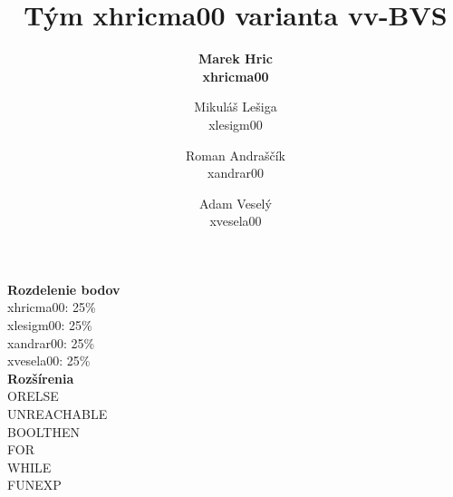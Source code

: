 \documentclass[12pt]{article}
\begin{document}
 
 
\title{\Huge \textbf{Tým xhricma00 varianta vv-BVS}}

\author{\bf Marek Hric \\
\bf xhricma00
\and Mikuláš Lešiga\\
 xlesigm00
\and Roman Andraščík \\
 xandrar00
\and Adam Veselý \\ 
xvesela00
}

\maketitle
\bigskip
\begin{center}
 \Large \textbf{Rozdelenie bodov}  \normalsize
 \\ 
\medskip
xhricma00: 25\% \\
xlesigm00: 25\% \\
xandrar00: 25\% \\
xvesela00: 25\%  \\
\bigskip
 \Large \textbf{Rozšírenia} \normalsize
\\
\medskip
ORELSE\\
UNREACHABLE\\
BOOLTHEN\\
FOR\\
WHILE\\
FUNEXP\\
\end{center}

\newpage
\end{document}
